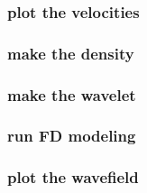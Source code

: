 \begin{frame} \frametitle{plot the velocities}

\end{frame}
\cwpnote{}

\begin{frame}  \end{frame}
\begin{frame}  \end{frame}

\begin{frame} \frametitle{make the density}

\end{frame}
\cwpnote{}

\begin{frame} \frametitle{make the wavelet}

\end{frame}
\cwpnote{}

\begin{frame}  \end{frame}

\begin{frame} \frametitle{run FD modeling}

\end{frame}
\cwpnote{}

\begin{frame} \frametitle{plot the wavefield}

\end{frame}
\cwpnote{}

